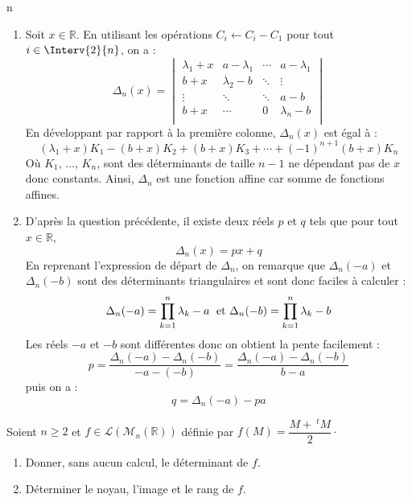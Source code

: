 n\documentclass[a4paper,10pt]{report}
\begin{document}
\begin{enumerate}
\item Soit $x \in \mathbb{R}$. En utilisant les opérations $C_i \leftarrow C_i - C_1$ pour tout $i \in \Interv{2}{n}$, on a :
    \[
    \Delta_n(x) =
    \begin{vmatrix}
        {\lambda_1 + x} & a - \lambda_1 & \cdots & a- \lambda_1 \\
        {b + x} & \lambda_2-b & \ddots & \vdots \\
        \vdots & \ddots & \ddots & a-b \\
        {b + x} & \cdots & 0 & \lambda_n-b \\
    \end{vmatrix}    
    \]
En développant par rapport à la première colonne, $\Delta_n(x)$ est égal à :
$$ (\lambda_1+x) K_1 - (b+x) K_2 + (b+x) K_3 + \cdots + (-1)^{n+1} (b+x) K_n$$
Où $K_1$, $\ldots$, $K_n$, sont des déterminants de taille $n-1$ ne dépendant pas de $x$ donc constants. Ainsi, $\Delta_n$ est une fonction affine car somme de fonctions affines.
\item D'après la question précédente, il existe deux réels $p$ et $q$ tels que pour tout $x \in \mathbb{R}$,
$$ \Delta_n(x) = px + q$$
En reprenant l'expression de départ de $\Delta_n$, on remarque que $\Delta_n(-a)$ et $\Delta_n(-b)$ sont des déterminants triangulaires et sont donc faciles à calculer :
$$ \Delta_n(-a) = \prod_{k=1}^n \lambda_k - a \; \hbox{ et } \Delta_n(-b) = \prod_{k=1}^n \lambda_k - b$$
Les réels $-a$ et $-b$ sont différentes donc on obtient la pente facilement :
$$ p = \dfrac{\Delta_n(-a) - \Delta_n(-b)}{-a-(-b)} = \dfrac{\Delta_n(-a) - \Delta_n(-b)}{b-a}$$
puis on a :
$$ q = \Delta_n(-a) -pa$$
\end{enumerate}

\begin{Exercice}{} Soient $n \geq 2$ et $f \in \mathcal{L}(\mathcal{M}_n(\mathbb{R}))$ définie par $f(M) = \dfrac{M+~^tM}{2}\cdot$

\begin{enumerate}
\item Donner, sans aucun calcul, le déterminant de $f$.
\item Déterminer le noyau, l'image et le rang de $f$. 
\end{enumerate}
\end{Exercice}

\corr
\end{document}
